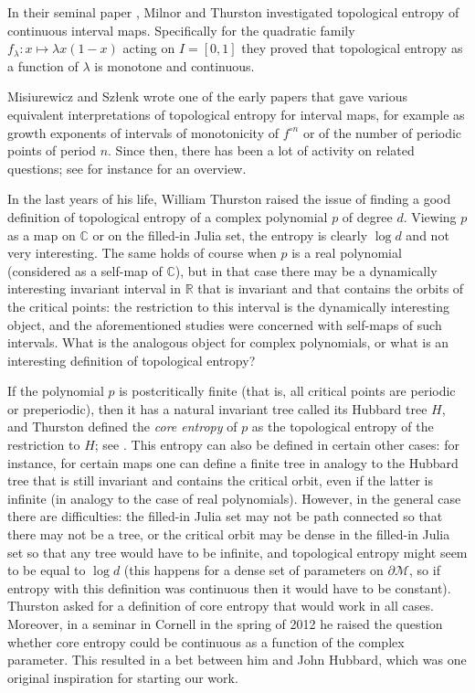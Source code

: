 \documentclass[12pt]{amsart}
\newcommand{\M}{\mathscr M}
\newcommand{\R}{\mathbb R}
\newcommand{\C}{\mathbb C}
\newcommand{\0}{\texttt{0}}
\newcommand{\1}{\texttt{1}}
\theoremstyle{definition}
\numberwithin{equation}{section}
\begin{document}
In their seminal paper \cite{MilnorThurston}, Milnor and Thurston investigated topological entropy of continuous interval maps. Specifically for the quadratic family $f_\lambda\colon x\mapsto \lambda x(1-x)$ acting on $I=[0,1]$ they proved that topological entropy as a function of $\lambda$ is monotone and continuous. 

Misiurewicz and Sz{\l}enk \cite{MisiurewiczSzlenk} wrote one of the early papers that gave various equivalent interpretations of topological entropy for interval maps, for example as growth exponents of intervals of monotonicity of $f^{\circ n}$ or of the number of periodic points of period $n$. Since then, there has been a lot of activity on related questions; see for instance \cite{deMelovanStrien} for an overview.

In the last years of his life, William Thurston raised the issue of finding a good definition of topological entropy of a complex polynomial $p$ of degree $d$. Viewing $p$ as a map on $\C$ or on the filled-in Julia set,  the entropy is clearly $\log d$ and not very interesting. The same holds of course when $p$ is a real polynomial (considered as a self-map of $\C$), but in that case there may be a dynamically interesting invariant interval in $\R$ that is invariant and that contains the orbits of the critical points: the restriction to this interval is the dynamically interesting object, and the aforementioned studies were concerned with self-maps of such intervals. What is the analogous object for complex polynomials, or what is an interesting definition of topological entropy?

If the polynomial $p$ is postcritically finite (that is, all critical points are periodic or preperiodic), then it has a natural invariant tree called its Hubbard tree $H$, and Thurston defined the \emph{core entropy} of $p$ as the topological entropy of the restriction to $H$; see \cite{bghkltt,taoli}. This entropy can also be defined in certain other cases: for instance, for certain maps one can define a finite tree in analogy to the Hubbard tree that is still invariant and contains the critical orbit, even if the latter is infinite (in analogy to the case of real polynomials). However, in the general case there are difficulties: the filled-in Julia set may not be path connected so that there may not be a tree, or the critical orbit may be dense in the filled-in Julia set so that any tree would have to be infinite, and topological entropy might seem to be equal to $\log d$ (this happens for a dense set of parameters on $\partial\M$, so if entropy with this definition was continuous then it would have to be constant). Thurston asked for a definition of core entropy that would work in all cases. Moreover, in a seminar in Cornell in the spring of 2012 he raised the question whether core entropy could be continuous as a function of the complex parameter. This resulted in a bet between him and John Hubbard, which was one original inspiration for starting our work.
\end{document}
